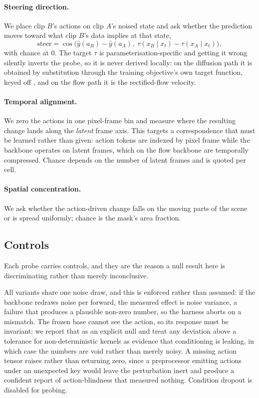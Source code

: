 \paragraph{Steering direction.} We place clip $B$'s actions on clip $A$'s
noised state and ask whether the prediction moves toward what clip $B$'s
data implies at that state,
\[
  \mathrm{steer} = \cos\big(\hat{y}(a_B) - \hat{y}(a_A),\; \tau(x_B \mid x_t) - \tau(x_A \mid x_t)\big),
\]
with chance at $0$. The target $\tau$ is parameterisation-specific and
getting it wrong silently inverts the probe, so it is never derived locally:
on the diffusion path it is obtained by substitution through the training
objective's own target function, keyed off , and on
the flow path it is the rectified-flow velocity.

\paragraph{Temporal alignment.} We zero the actions in one pixel-frame bin
and measure where the resulting change lands along the \emph{latent} frame
axis. This targets a correspondence that must be learned rather than given:
action tokens are indexed by pixel frame while the backbone operates on
latent frames, which on the flow backbone are temporally compressed. Chance
depends on the number of latent frames and is quoted per cell.

\paragraph{Spatial concentration.} We ask whether the action-driven change
falls on the moving parts of the scene or is spread uniformly; chance is the
mask's area fraction.

\subsection{Controls}

Each probe carries controls, and they are the reason a null result here is
discriminating rather than merely inconclusive.

All variants share one noise draw, and this is enforced rather than assumed:
if the backbone redraws noise per forward, the measured effect is noise
variance, a failure that produces a plausible non-zero number, so the
harness aborts on a mismatch. The frozen base cannot see the action, so its
response must be invariant; we report that as an explicit null and treat any
deviation above a tolerance for non-deterministic kernels as evidence that
conditioning is leaking, in which case the numbers are void rather than
merely noisy. A missing action tensor raises rather than returning zero,
since a preprocessor emitting actions under an unexpected key would leave
the perturbation inert and produce a confident report of action-blindness
that measured nothing. Condition dropout is disabled for probing.

